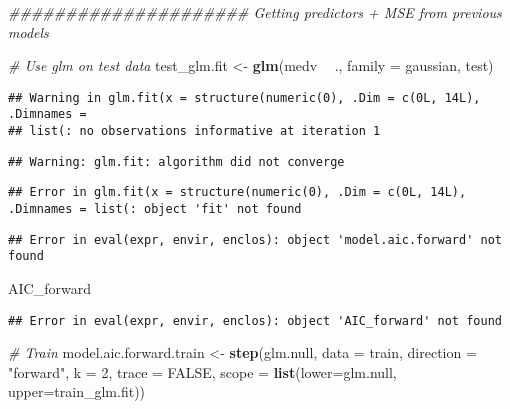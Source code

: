 \documentclass[]{article}
\newenvironment{Shaded}{\begin{snugshade}}{\end{snugshade}}
\newcommand{\CommentTok}[1]{\textcolor[rgb]{0.56,0.35,0.01}{\textit{#1}}}
\newcommand{\DataTypeTok}[1]{\textcolor[rgb]{0.13,0.29,0.53}{#1}}
\newcommand{\DecValTok}[1]{\textcolor[rgb]{0.00,0.00,0.81}{#1}}
\newcommand{\KeywordTok}[1]{\textcolor[rgb]{0.13,0.29,0.53}{\textbf{#1}}}
\newcommand{\NormalTok}[1]{#1}
\newcommand{\OperatorTok}[1]{\textcolor[rgb]{0.81,0.36,0.00}{\textbf{#1}}}
\newcommand{\OtherTok}[1]{\textcolor[rgb]{0.56,0.35,0.01}{#1}}
\newcommand{\StringTok}[1]{\textcolor[rgb]{0.31,0.60,0.02}{#1}}
\begin{document}
\begin{Shaded}
\begin{Highlighting}[]
\CommentTok{##################### Getting predictors + MSE from previous models}

\CommentTok{# Use glm on test data}
\NormalTok{test_glm.fit <-}\StringTok{ }\KeywordTok{glm}\NormalTok{(medv }\OperatorTok{~}\StringTok{ }\NormalTok{., }\DataTypeTok{family =}\NormalTok{ gaussian, test)}
\end{Highlighting}
\end{Shaded}

\begin{verbatim}
## Warning in glm.fit(x = structure(numeric(0), .Dim = c(0L, 14L), .Dimnames =
## list(: no observations informative at iteration 1
\end{verbatim}

\begin{verbatim}
## Warning: glm.fit: algorithm did not converge
\end{verbatim}

\begin{verbatim}
## Error in glm.fit(x = structure(numeric(0), .Dim = c(0L, 14L), .Dimnames = list(: object 'fit' not found
\end{verbatim}

\begin{Shaded}
\end{Shaded}

\begin{verbatim}
## Error in eval(expr, envir, enclos): object 'model.aic.forward' not found
\end{verbatim}

\begin{Shaded}
\begin{Highlighting}[]
\NormalTok{AIC_forward}
\end{Highlighting}
\end{Shaded}

\begin{verbatim}
## Error in eval(expr, envir, enclos): object 'AIC_forward' not found
\end{verbatim}

\begin{Shaded}
\begin{Highlighting}[]
\CommentTok{# Train}
\NormalTok{model.aic.forward.train <-}\StringTok{ }\KeywordTok{step}\NormalTok{(glm.null, }\DataTypeTok{data =}\NormalTok{ train, }\DataTypeTok{direction =} \StringTok{"forward"}\NormalTok{, }\DataTypeTok{k =} \DecValTok{2}\NormalTok{, }\DataTypeTok{trace =} \OtherTok{FALSE}\NormalTok{,}
                          \DataTypeTok{scope =} \KeywordTok{list}\NormalTok{(}\DataTypeTok{lower=}\NormalTok{glm.null, }\DataTypeTok{upper=}\NormalTok{train_glm.fit))}
\end{Highlighting}
\end{Shaded}
\end{document}
